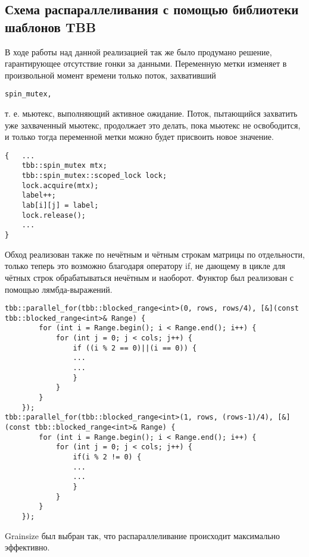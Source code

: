 \documentclass{report}
\begin{document}
\subsection{Схема распараллеливания с помощью библиотеки шаблонов TBB}
В ходе работы над данной реализацией так же было продумано решение, гарантирующее отсутствие гонки за данными. Переменную метки изменяет в произвольной момент времени только поток, захвативший
\begin{lstlisting}
spin_mutex,
\end{lstlisting}
т. е. мьютекс, выполняющий активное ожидание. Поток, пытающийся захватить уже захваченный мьютекс, продолжает это делать, пока мьютекс не освободится, и только тогда переменной метки можно будет присвоить новое значение.
\begin{lstlisting}
{   ...
    tbb::spin_mutex mtx;
    tbb::spin_mutex::scoped_lock lock;
    lock.acquire(mtx);
    label++;
    lab[i][j] = label;
    lock.release();
    ...
}
\end{lstlisting}
\par Обход реализован также по нечётным и чётным строкам матрицы по отдельности, только теперь это возможно благодаря оператору if, не дающему в цикле для чётных строк обрабатываться нечётным и наоборот. Функтор был реализован с помощью лямбда-выражений.
\begin{lstlisting}
tbb::parallel_for(tbb::blocked_range<int>(0, rows, rows/4), [&](const tbb::blocked_range<int>& Range) {
        for (int i = Range.begin(); i < Range.end(); i++) {
            for (int j = 0; j < cols; j++) { 
                if ((i % 2 == 0)||(i == 0)) {
                ...
                ...
                }
            }
        }
    });
tbb::parallel_for(tbb::blocked_range<int>(1, rows, (rows-1)/4), [&](const tbb::blocked_range<int>& Range) {
        for (int i = Range.begin(); i < Range.end(); i++) {
            for (int j = 0; j < cols; j++) {
                if(i % 2 != 0) {
                ...
                ...
                }
            }
        }
    });
\end{lstlisting}
Grainsize был выбран так, что распараллеливание происходит максимально эффективно.
\end{document}
